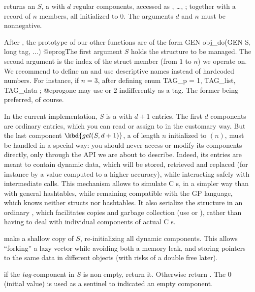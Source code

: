  returns an  $S$, a 
with $d$ regular components, accessed as , \dots,
; together with a record of $n$ members, all initialized to
$0$. The arguments $d$ and $n$ must be nonnegative.

After , the prototype of our other functions are of
the form
\bprog
  GEN obj_do(GEN S, long tag, ...)
@eprog\noindent The first argument $S$ holds the structure to be managed.
The second argument  is the index of the struct member (from $1$ to
$n$) we operate on. We recommend to define an  and use descriptive
names instead of hardcoded numbers. For instance, if $n = 3$, after defining
\bprog
  enum { TAG_p = 1, TAG_list, TAG_data };
@eprog\noindent one may use  or $2$ indifferently as a tag.
The former being preferred, of course.

In the current implementation, $S$ is a  with $d+1$ entries.
The first $d$ components are ordinary  entries, which you can
read or assign to in the customary way. But the last component $\kbd{gel(S,
d+1)}$, a  of length $n$ initialized to $(n)$, must
be handled in a special way: you should never access or modify its components
directly, only through the API we are about to describe. Indeed, its entries
are meant to contain dynamic data, which will be stored, retrieved and
replaced (for instance by a value computed to a higher accuracy), while
interacting safely with intermediate  calls. This mechanism
allows to simulate C s, in a simpler way than with general
hashtables, while remaining compatible with the GP language, which knows
neither structs nor hashtables. It also serialize the structure in an
ordinary , which facilitates copies and garbage collection (use
 or ), rather than having to deal with individual
components of actual C s.

 make a shallow copy of $S$, re-initializing
all dynamic components. This allows ``forking'' a lazy vector while
avoiding both a memory leak, and storing pointers to the same data
in different objects (with risks of a double free later).

 if the \emph{tag}-component in $S$
is non empty, return it. Otherwise return . The  $0$
(initial value) is used as a sentinel to indicated an empty component.

